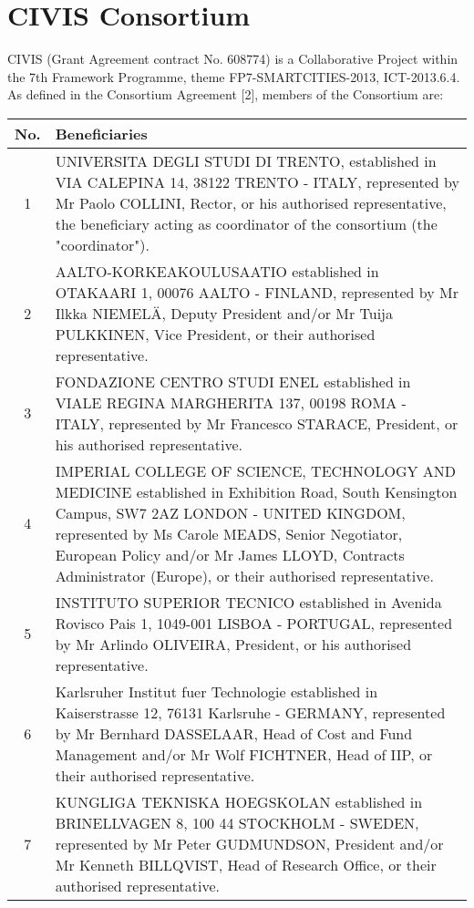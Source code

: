 
\section*{CIVIS Consortium}
CIVIS (Grant Agreement contract No. 608774) is a Collaborative Project within the 7th Framework Programme, theme FP7-SMARTCITIES-2013, ICT-2013.6.4. As defined in the Consortium Agreement [2], members of the Consortium are:

\vspace{.2cm}

\begin{longtable}{|c|p{14.5cm}|}
\hline
\textbf{No.} & \textbf{Beneficiaries} \\ \hline
1 &	UNIVERSITA DEGLI STUDI DI TRENTO, established in VIA CALEPINA 14, 38122 TRENTO - ITALY, represented by Mr Paolo COLLINI, Rector, or his authorised representative, the beneficiary acting as coordinator of the consortium (the "coordinator"). \\ \hline
2 &	AALTO-KORKEAKOULUSAATIO established in OTAKAARI 1, 00076 AALTO -
FINLAND, represented by Mr Ilkka NIEMEL\"{A}, Deputy President and/or Mr Tuija PULKKINEN,
Vice President, or their authorised representative. \\ \hline
3 &	FONDAZIONE CENTRO STUDI ENEL established in VIALE REGINA MARGHERITA 137, 00198 ROMA - ITALY, represented by Mr Francesco STARACE, President, or his authorised representative. \\ \hline
4 &	IMPERIAL COLLEGE OF SCIENCE, TECHNOLOGY AND MEDICINE established
in Exhibition Road, South Kensington Campus, SW7 2AZ LONDON - UNITED KINGDOM, represented by Ms Carole MEADS, Senior Negotiator, European Policy and/or Mr James LLOYD, Contracts Administrator (Europe), or their authorised representative. \\ \hline
5 &	INSTITUTO SUPERIOR TECNICO established in Avenida Rovisco Pais 1, 1049-001 LISBOA - PORTUGAL, represented by Mr Arlindo OLIVEIRA, President, or his authorised representative. \\ \hline
6 &	Karlsruher Institut fuer Technologie established in Kaiserstrasse 12, 76131 Karlsruhe - GERMANY, represented by Mr Bernhard DASSELAAR, Head of Cost and Fund Management and/or Mr Wolf FICHTNER, Head of IIP, or their authorised representative. \\ \hline
7 &	KUNGLIGA TEKNISKA HOEGSKOLAN established in BRINELLVAGEN 8, 100 44
STOCKHOLM - SWEDEN, represented by Mr Peter GUDMUNDSON, President and/or Mr Kenneth BILLQVIST, Head of Research Office, or their authorised representative. \\ \hline

\end{longtable}
